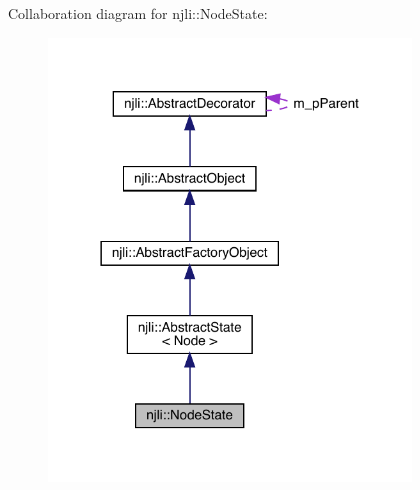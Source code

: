 Collaboration diagram for njli\+:\+:Node\+State\+:\nopagebreak
\begin{figure}[H]
\begin{center}
\leavevmode
\includegraphics[width=273pt]{classnjli_1_1_node_state__coll__graph}
\end{center}
\end{figure}

